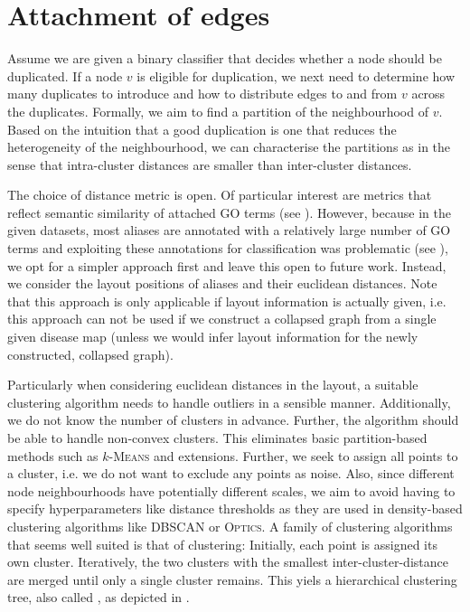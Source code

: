 \documentclass[
	fontsize=10pt, %
	twoside=false, %
	secnumdepth=1, %
  toc=indentunnumbered %
]{kaobook}
\begin{document}
\section{Attachment of edges}
\label{sec:edge-attachment}


Assume we are given a binary classifier that decides whether a node should be
duplicated. If a node $v$ is eligible for duplication, we next need to determine
how many duplicates to introduce and how to distribute edges to and from $v$
across the duplicates. Formally, we aim to find a partition of the neighbourhood
of $v$. Based on the intuition that a good duplication is one that reduces the
heterogeneity of the neighbourhood, we can characterise the partitions as
 in the sense that intra-cluster distances are smaller than
inter-cluster distances.

The choice of distance metric is open. Of particular interest are metrics that
reflect semantic similarity of attached GO terms
(see ).
However, because in the given
datasets, most aliases are annotated with a relatively large number of GO terms
and exploiting these annotations for classification was problematic (see ),
we opt for a
simpler approach first and leave this open to future work. 
Instead, we consider the layout positions of aliases and their euclidean
distances. Note that this approach is only applicable if layout information is
actually given, i.e. this approach can not be used if we construct a collapsed
graph from a single given disease map (unless we would infer layout information
for the newly constructed, collapsed graph).

Particularly when considering euclidean distances in the layout, a suitable
clustering algorithm needs to handle outliers in a sensible manner.
Additionally, we do not know the number of clusters in advance. Further, the
algorithm should be able to handle non-convex clusters. This eliminates basic
partition-based methods such as $k$-\textsc{Means} and extensions.
%
Further, we seek to assign all points to a cluster, i.e. we do not want to
exclude any points as noise. Also, since different node neighbourhoods have
potentially different scales, we aim to avoid having to specify hyperparameters
like distance thresholds as they are used in density-based clustering algorithms
like \textsc{DBSCAN} or \textsc{Optics}.
%
A family of clustering algorithms that seems well suited is that of
 clustering: Initially, each point is assigned its own
cluster. Iteratively, the two clusters with the smallest inter-cluster-distance
are merged until only a single cluster remains. This yiels a hierarchical
clustering tree, also called , as depicted in
.
\end{document}
